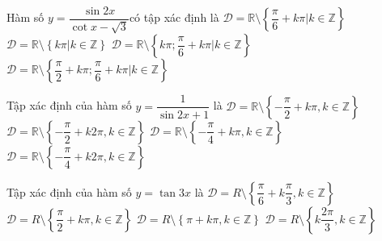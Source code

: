 \begin{ex}%
	Hàm số $y=\dfrac{\sin 2x}{\cot x-\sqrt{3}}$có tập xác định  là
	 \choice
		{$\mathscr{D}=\mathbb{R}\setminus\left\{\dfrac{\pi}{6}+k\pi  \big|k\in\mathbb{Z}\right\}$}
		{$\mathscr{D}=\mathbb{R}\setminus\left\{  k\pi \big|k\in\mathbb{Z}\right\}$}
		 {\True $\mathscr{D}=\mathbb{R}\setminus\left\{ k\pi;\dfrac{\pi}{6}+k\pi \big|k\in\mathbb{Z}\right\}$}
		{$\mathscr{D}=\mathbb{R}\setminus\left\{\dfrac{\pi}{2}+k\pi;\dfrac{\pi}{6}+k\pi \big|k\in\mathbb{Z}\right\}$} 
\end{ex}

\begin{ex}%
	Tập xác định của hàm số $y=\dfrac{1}{\sin  2x+1}$ là
	 \choice
		{$\mathscr{D}=\mathbb{R}\setminus\left\{-\dfrac{\pi}{2}+k\pi  ,k\in\mathbb{Z}\right\}$}
		{$\mathscr{D}=\mathbb{R}\setminus\left\{-\dfrac{\pi}{2}+k2\pi ,k\in\mathbb{Z}\right\}$} 
		{\True $\mathscr{D}=\mathbb{R}\setminus\left\{-\dfrac{\pi}{4}+k\pi ,k\in\mathbb{Z}\right\}$} 
		 {$\mathscr{D}=\mathbb{R}\setminus\left\{-\dfrac{\pi}{4}+k2\pi ,k\in\mathbb{Z}\right\}$}
\end{ex}

\begin{ex}%
	Tập xác định của hàm số $y=\tan 3x$ là 
	 \choice
		{\True  $\mathscr{D}=R\setminus\left\{\dfrac{\pi}{6}+k\dfrac{\pi}{3},k\in \mathbb{Z}\right\}$}
		{$\mathscr{D}=R\setminus\left\{\dfrac{\pi}{2}+k\pi,k\in  \mathbb{Z}\right\}$}
		{$\mathscr{D}=R\setminus\left\{\pi+k\pi ,k\in  \mathbb{Z}\right\}$}
		{$\mathscr{D}=R\setminus\left\{ k\dfrac{2\pi}{3},k\in  \mathbb{Z}\right\}$}
\end{ex}

